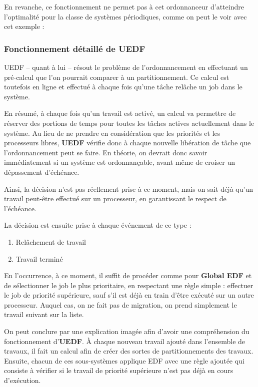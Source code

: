 		En revanche, ce fonctionnement ne permet pas à cet ordonnanceur d'atteindre 
		l'optimalité pour la classe de systèmes périodiques, comme on peut le voir 
		avec cet exemple :

		\subsubsection{Fonctionnement détaillé de UEDF}
		UEDF -- quant à lui -- résout le problème de l'ordonnancement en effectuant un pré-calcul 
		que l'on pourrait comparer à un partitionnement. Ce calcul est toutefois en ligne et 
		effectué à chaque fois qu'une tâche relâche un job dans le système.
		
		En résumé, à chaque fois qu'un travail est activé, un calcul va permettre 
		de réserver des portions de temps pour toutes les tâches actives 
		actuellement dans le système. Au lieu de ne prendre en considération que 
		les priorités et les processeurs libres, \textbf{UEDF }vérifie donc à 
		chaque nouvelle libération de tâche que l'ordonnancement peut se faire. 
		En théorie, on devrait donc savoir immédiatement si un système est ordonnançable, 
		avant même de croiser un dépassement d'échéance. 
		
		Ainsi, la décision n'est pas réellement prise à ce moment, 
		mais on sait déjà qu'un travail peut-être effectué sur un 
		processeur, en garantissant le respect de l'échéance.
		
		La décision est ensuite prise à chaque événement de ce type :
		\begin{enumerate}
			\item Relâchement de travail
			\item Travail terminé
		\end{enumerate}

		En l'occurrence, à ce moment, il suffit de procéder comme pour \textbf{Global EDF} et de sélectionner le job le plus prioritaire, en respectant 
		une règle simple : effectuer le job de priorité supérieure, sauf s'il 
		est déjà en train d'être exécuté sur un autre processeur. Auquel cas, on ne 
		fait pas de migration, on prend simplement le travail suivant sur la liste.\newline
		
		On peut conclure par une explication imagée afin d'avoir une compréhension du fonctionnement d'\textbf{UEDF}. À chaque nouveau travail ajouté dans l'ensemble de travaux, 
		il fait un calcul afin de créer des sortes de partitionnements des travaux. 
		Ensuite, chacun de ces sous-systèmes applique EDF avec une règle ajoutée qui consiste 
		à vérifier si le travail de priorité supérieure n'est pas déjà en cours d'exécution.
		
